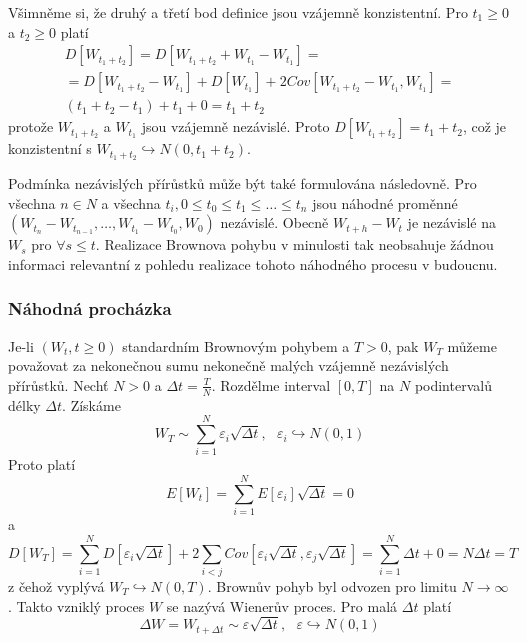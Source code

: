 \documentclass[a4paper]{book}
\begin{document}
Všimněme si, že druhý a třetí bod definice jsou vzájemně konzistentní. Pro $t_1 \ge 0$ a $t_2 \ge 0$ platí
\begin{gather*}
D[W_{t_1 + t_2}] = D[W_{t_1 + t_2} + W_{t_1} - W_{t_1}] = \\
= D[W_{t_1 + t_2} - W_{t_1}] + D[W_{t_1}] + 2 Cov[W_{t_1 + t_2} - W_{t_1}, W_{t_1}] = \\
(t_1 + t_2 - t_1) + t_1 + 0 = t_1 + t_2
\end{gather*}
protože $W_{t_1 + t_2}$ a $W_{t_1}$ jsou vzájemně nezávislé. Proto $D[W_{t_1 + t_2}] = t_1 + t_2$, což je konzistentní s $W_{t_1 + t_2} \hookrightarrow N(0, t_1 + t_2)$.

Podmínka nezávislých přírůstků může být také formulována následovně. Pro všechna $n \in N$ a všechna $t_i, 0 \le t_0 \le t_1 \le \dots \le t_n$ jsou náhodné proměnné $(W_{t_n} - W_{t_{n-1}}, \dots, W_{t_1} - W_{t_0}, W_0)$ nezávislé. Obecně $W_{t + h} - W_t$ je nezávislé na $W_s$ pro $\forall s \le t$. Realizace Brownova pohybu v minulosti tak neobsahuje žádnou informaci relevantní z pohledu realizace tohoto náhodného procesu v budoucnu.

\subsubsection{Náhodná procházka}

Je-li $(W_t, t \ge 0)$ standardním Brownovým pohybem a $T > 0$, pak $W_T$ můžeme považovat za nekonečnou sumu nekonečně malých vzájemně nezávislých přírůstků. Nechť $N > 0$ a $\Delta t = \frac{T}{N}$. Rozdělme interval $[0,T]$ na $N$ podintervalů délky $\Delta t$. Získáme
\begin{equation*}
W_T \sim \sum_{i=1}^N \varepsilon_i \sqrt{\Delta t},~~~ \varepsilon_i \hookrightarrow N(0,1)
\end{equation*}
Proto platí
\begin{equation*}
E[W_t] = \sum_{i = 1}^N E[\varepsilon_i]\sqrt{\Delta t} = 0
\end{equation*}
a
\begin{equation*}
D[W_T] = \sum_{i = 1}^N D[\varepsilon_i \sqrt{\Delta t}] + 2 \sum_{i < j}Cov[\varepsilon_i \sqrt{\Delta t}, \varepsilon_j \sqrt{\Delta t}] = \sum_{i = 1}^N \Delta t + 0 = N \Delta t = T
\end{equation*}
z čehož vyplývá $W_T \hookrightarrow N(0,T)$. Brownův pohyb byl odvozen pro limitu $N \rightarrow \infty$. Takto vzniklý proces $W$ se nazývá Wienerův proces. Pro malá $\Delta t$ platí
\begin{equation*}
\Delta W = W_{t + \Delta t} \sim \varepsilon \sqrt{\Delta t},~~~ \varepsilon \hookrightarrow N(0,1)
\end{equation*}
\end{document}
